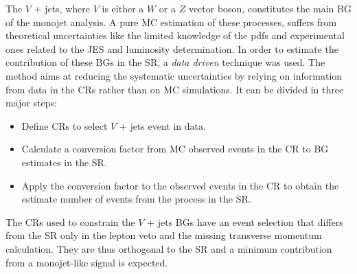 The $V$ + jets, where $V$ is either a $W$ or a $Z$ vector boson, constitutes the
main BG of the monojet analysis. A pure MC estimation of these processes,
suffers from theoretical uncertainties like the limited knowledge of the
\glspl{pdf} and experimental ones related to the JES and luminosity
determination. In order to estimate the contribution of these BGs in the SR, a
\emph{data driven} technique was used. The method aims at reducing the
systematic uncertainties by relying on information from data in the CRs rather
than on MC simulations. It can be divided in three major steps:
\begin{itemize}
\item Define CRs to select $V$ + jets event in data.
\item Calculate a conversion factor from MC observed events in the CR to BG
  estimates in the SR\@.
\item Apply the conversion factor to the observed events in the CR to obtain the
  estimate number of events from the process in the SR\@.
\end{itemize}
The CRs used to constrain the $V$ + jets BGs have an event selection that
differs from the SR only in the lepton veto and the missing transverse momentum
calculation. They are thus orthogonal to the SR and a minimum contribution from
a monojet-like signal is expected.
